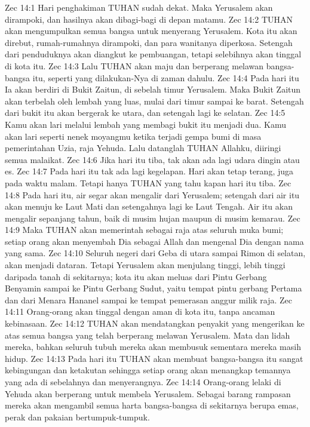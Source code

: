 Zec 14:1  Hari penghakiman TUHAN sudah dekat. Maka Yerusalem akan dirampoki, dan hasilnya akan dibagi-bagi di depan matamu.
Zec 14:2  TUHAN akan mengumpulkan semua bangsa untuk menyerang Yerusalem. Kota itu akan direbut, rumah-rumahnya dirampoki, dan para wanitanya diperkosa. Setengah dari penduduknya akan diangkut ke pembuangan, tetapi selebihnya akan tinggal di kota itu.
Zec 14:3  Lalu TUHAN akan maju dan berperang melawan bangsa-bangsa itu, seperti yang dilakukan-Nya di zaman dahulu.
Zec 14:4  Pada hari itu Ia akan berdiri di Bukit Zaitun, di sebelah timur Yerusalem. Maka Bukit Zaitun akan terbelah oleh lembah yang luas, mulai dari timur sampai ke barat. Setengah dari bukit itu akan bergerak ke utara, dan setengah lagi ke selatan.
Zec 14:5  Kamu akan lari melalui lembah yang membagi bukit itu menjadi dua. Kamu akan lari seperti nenek moyangmu ketika terjadi gempa bumi di masa pemerintahan Uzia, raja Yehuda. Lalu datanglah TUHAN Allahku, diiringi semua malaikat.
Zec 14:6  Jika hari itu tiba, tak akan ada lagi udara dingin atau es.
Zec 14:7  Pada hari itu tak ada lagi kegelapan. Hari akan tetap terang, juga pada waktu malam. Tetapi hanya TUHAN yang tahu kapan hari itu tiba.
Zec 14:8  Pada hari itu, air segar akan mengalir dari Yerusalem; setengah dari air itu akan menuju ke Laut Mati dan setengahnya lagi ke Laut Tengah. Air itu akan mengalir sepanjang tahun, baik di musim hujan maupun di musim kemarau.
Zec 14:9  Maka TUHAN akan memerintah sebagai raja atas seluruh muka bumi; setiap orang akan menyembah Dia sebagai Allah dan mengenal Dia dengan nama yang sama.
Zec 14:10  Seluruh negeri dari Geba di utara sampai Rimon di selatan, akan menjadi dataran. Tetapi Yerusalem akan menjulang tinggi, lebih tinggi daripada tanah di sekitarnya; kota itu akan meluas dari Pintu Gerbang Benyamin sampai ke Pintu Gerbang Sudut, yaitu tempat pintu gerbang Pertama dan dari Menara Hananel sampai ke tempat pemerasan anggur milik raja.
Zec 14:11  Orang-orang akan tinggal dengan aman di kota itu, tanpa ancaman kebinasaan.
Zec 14:12  TUHAN akan mendatangkan penyakit yang mengerikan ke atas semua bangsa yang telah berperang melawan Yerusalem. Mata dan lidah mereka, bahkan seluruh tubuh mereka akan membusuk sementara mereka masih hidup.
Zec 14:13  Pada hari itu TUHAN akan membuat bangsa-bangsa itu sangat kebingungan dan ketakutan sehingga setiap orang akan menangkap temannya yang ada di sebelahnya dan menyerangnya.
Zec 14:14  Orang-orang lelaki di Yehuda akan berperang untuk membela Yerusalem. Sebagai barang rampasan mereka akan mengambil semua harta bangsa-bangsa di sekitarnya berupa emas, perak dan pakaian bertumpuk-tumpuk.
